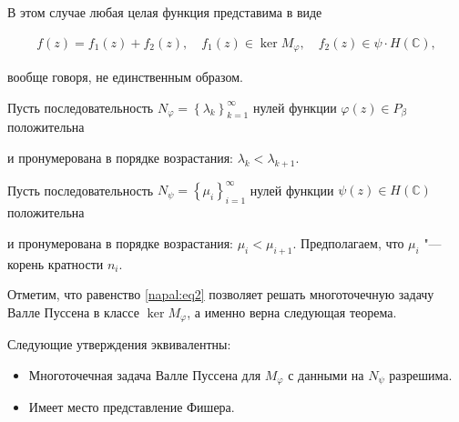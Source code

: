 В этом случае любая целая функция представима в виде

\begin{eqnarray*}

    f(z) = f_1(z) + f_2(z), \quad f_1(z) \in \ker M_\varphi, \quad f_2(z) \in \psi \cdot H(\mathbb{C}),

\end{eqnarray*}

 вообще говоря, не единственным образом.



Пусть последовательность $N_\varphi = \left\{\lambda_k\right\}_{k=1}^\infty$ нулей функции $\varphi(z)\in P_\beta$ положительна %

 и пронумерована в порядке возрастания: $\lambda_k < \lambda_{k+1}.$%



  Пусть последовательность $N_\psi = \left\{\mu_i\right\}_{i=1} ^\infty$ нулей функции $\psi(z)\in H(\mathbb{C})$ положительна %

   и пронумерована в порядке возрастания: $\mu_i < \mu_{i+1}.$ Предполагаем, что $\mu_i$ "--- корень кратности $n_i.$%



Отметим, что равенство \eqref{napal:eq2} позволяет решать многоточечную задачу Валле Пуссена в классе $\ker M_\varphi$, а именно верна следующая теорема.



\smallskip



\begin{theorem}[1]Следующие утверждения эквивалентны\/{\rm:}

\begin{itemize}

\item[\rm 1.]  Многоточечная задача Валле Пуссена для $M_\varphi$ с данными на $N_\psi$ разрешима{\rm.}



\item[\rm 2.] Имеет место представление Фишера{\rm.}



\end{itemize}

\end{theorem}



\smallskip



